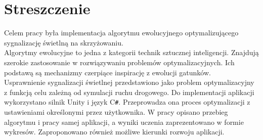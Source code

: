 \chapter*{Streszczenie}
Celem pracy była implementacja algorytmu ewolucyjnego optymalizującego sygnalizację świetlną na skrzyżowaniu. \\Algorytmy ewolucyjne to jedna z kategorii technik sztucznej inteligencji. Znajdują szerokie zastosowanie w rozwiązywaniu problemów optymalizacyjnych. Ich podstawą są mechanizmy czerpiące inspirację z ewolucji gatunków. \\
Usprawnienie sygnalizacji świetlnej przedstawiono jako problem optymalizacyjny z funkcją celu zależną od symulacji ruchu drogowego.
Do implementacji aplikacji wykorzystano silnik Unity i język C\texttt{\#}. Przeprowadza ona proces optymalizacji z ustawieniami określonymi przez użytkownika. W pracy opisano przebieg algorytmu i pracy samej aplikacji, a wyniki uczenia zaprezentowano w formie wykresów. Zaproponowano również możliwe kierunki rozwoju aplikacji.